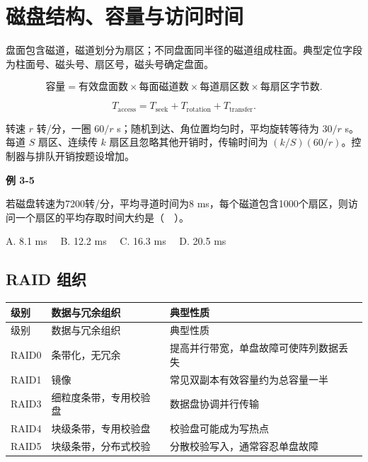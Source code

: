 \section{磁盘结构、容量与访问时间}\label{CO03-disk}

盘面包含磁道，磁道划分为扇区；不同盘面同半径的磁道组成柱面。典型定位字段为柱面号、磁头号、扇区号，磁头号确定盘面。

\[\text{容量}=\text{有效盘面数}\times\text{每面磁道数}\times\text{每道扇区数}\times\text{每扇区字节数}.\]

\[T_{\mathrm{access}}=T_{\mathrm{seek}}+T_{\mathrm{rotation}}+T_{\mathrm{transfer}}.\]

转速 \(r\) 转/分，一圈 \(60/r\) s；随机到达、角位置均匀时，平均旋转等待为 \(30/r\) s。每道 \(S\) 扇区、连续传 \(k\) 扇区且忽略其他开销时，传输时间为 \((k/S)(60/r)\)。控制器与排队开销按题设增加。

\par\medskip{}\noindent\hypertarget{CO03-E05}{}\label{CO03-E05}\textbf{例 3-5}\par\nobreak\smallskip

若磁盘转速为7200转/分，平均寻道时间为8 ms，每个磁道包含1000个扇区，则访问一个扇区的平均存取时间大约是（　）。

A. 8.1 ms　 B. 12.2 ms　 C. 16.3 ms　 D. 20.5 ms

\subsection{RAID 组织}\label{CO03-raid}

\par\smallskip
{\fontsize{9.3}{12}\selectfont\setlength{\tabcolsep}{2.5pt}\setlength{\LTleft}{0pt}\setlength{\LTright}{0pt}
\begin{longtable}{@{}>{\raggedright\arraybackslash}p{}>{\raggedright\arraybackslash}p{}>{\raggedright\arraybackslash}p{}@{}}
\toprule
级别 & 数据与冗余组织 & 典型性质 \\

\midrule\endfirsthead\toprule
级别 & 数据与冗余组织 & 典型性质 \\

\midrule\endhead\bottomrule\endfoot
RAID0 & 条带化，无冗余 & 提高并行带宽，单盘故障可使阵列数据丢失 \\

RAID1 & 镜像 & 常见双副本有效容量约为总容量一半 \\

RAID3 & 细粒度条带，专用校验盘 & 数据盘协调并行传输 \\

RAID4 & 块级条带，专用校验盘 & 校验盘可能成为写热点 \\

RAID5 & 块级条带，分布式校验 & 分散校验写入，通常容忍单盘故障 \\

\end{longtable}}
\par\smallskip

